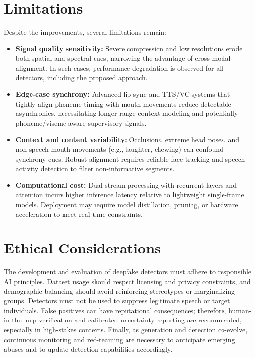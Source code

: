 \section{Limitations}
Despite the improvements, several limitations remain:
\begin{itemize}
    \item \textbf{Signal quality sensitivity:} Severe compression and low resolutions erode both spatial and spectral cues, narrowing the advantage of cross-modal alignment. In such cases, performance degradation is observed for all detectors, including the proposed approach.
    \item \textbf{Edge-case synchrony:} Advanced lip-sync and TTS/VC systems that tightly align phoneme timing with mouth movements reduce detectable asynchronies, necessitating longer-range context modeling and potentially phoneme/viseme-aware supervisory signals.
    \item \textbf{Context and content variability:} Occlusions, extreme head poses, and non-speech mouth movements (e.g., laughter, chewing) can confound synchrony cues. Robust alignment requires reliable face tracking and speech activity detection to filter non-informative segments.
    \item \textbf{Computational cost:} Dual-stream processing with recurrent layers and attention incurs higher inference latency relative to lightweight single-frame models. Deployment may require model distillation, pruning, or hardware acceleration to meet real-time constraints.
\end{itemize}

\section{Ethical Considerations}
The development and evaluation of deepfake detectors must adhere to responsible AI principles. Dataset usage should respect licensing and privacy constraints, and demographic balancing should avoid reinforcing stereotypes or marginalizing groups. Detectors must not be used to suppress legitimate speech or target individuals. False positives can have reputational consequences; therefore, human-in-the-loop verification and calibrated uncertainty reporting are recommended, especially in high-stakes contexts. Finally, as generation and detection co-evolve, continuous monitoring and red-teaming are necessary to anticipate emerging abuses and to update detection capabilities accordingly.

